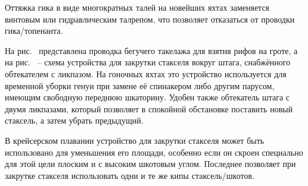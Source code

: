 Оттяжка гика в виде многократных талей на новейших яхтах заменяется
винтовым или гидравлическим талрепом, что позволяет отказаться от
проводки гика\-/топенанта.

На рис.~ представлена проводка бегучего такелажа для взятия
рифов на гроте, а на рис.~ \--- схема устройства для закрутки
стакселя вокруг штага, снабжённого обтекателем с ликпазом. На гоночных
яхтах это устройство используется для временной уборки генуи при
замене её спинакером либо другим парусом, имеющим свободную переднюю
шкаторину. Удобен также обтекатель штага с двумя ликпазами, который
позволяет в спокойной обстановке поставить новый стаксель, а затем
убрать предыдущий.

В крейсерском плавании устройство для закрутки стакселя может быть
использовано для уменьшения его площади, особенно если он скроен
специально для этой цели плоским и с высоким шкотовым углом. Последнее
позволяет при закрутке стакселя использовать одни и те же кипы
стаксель\-/шкотов.

